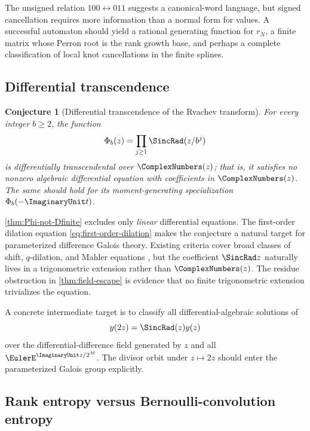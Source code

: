 \documentclass[11pt]{article}
\numberwithin{equation}{section}
\newtheorem{conjecture}[theorem]{Conjecture}
\theoremstyle{definition}
\theoremstyle{remark}
\begin{document}
The unsigned relation $100\leftrightarrow011$ suggests a canonical-word
language, but signed cancellation requires more information than a normal form
for values.  A successful automaton should yield a rational generating
function for $r_N$, a finite matrix whose Perron root is the rank growth base,
and perhaps a complete classification of local knot cancellations in the
finite splines.

\subsection{Differential transcendence}

\begin{conjecture}[Differential transcendence of the Rvachev transform]
\label{conj:differential-transcendence}
For every integer $b\ge2$, the function
\begin{equation}
 \Phi_b(z)=\prod_{j\ge1}\SincRad(z/b^j)
 \label{eq:DT-conjecture-function}
\end{equation}
is differentially transcendental over $\ComplexNumbers(z)$; that is, it satisfies no
nonzero algebraic differential equation with coefficients in $\ComplexNumbers(z)$.
The same should hold for its moment-generating specialization
$\Phi_b(-\ImaginaryUnit t)$.
\end{conjecture}

\cref{thm:Phi-not-Dfinite} excludes only \emph{linear} differential equations.
The first-order dilation equation \eqref{eq:first-order-dilation} makes the
conjecture a natural target for parameterized difference Galois theory.
Existing criteria cover broad classes of shift, $q$-dilation, and Mahler
equations \cite{ArrecheDreyfusRoques,AdamczewskiDreyfusHardouinWibmer}, but the
coefficient $\SincRad z$ naturally lives in a trigonometric extension rather than
$\ComplexNumbers(z)$.  The residue obstruction in \cref{thm:field-escape} is evidence that no
finite trigonometric extension trivializes the equation.

A concrete intermediate target is to classify all differential-algebraic
solutions of
\begin{equation}
 y(2z)=\SincRad(z)y(z)
 \label{eq:dilation-DT-target}
\end{equation}
over the differential-difference field generated by
$z$ and all $\EulerE^{\ImaginaryUnit z/2^M}$.  The divisor orbit under $z\mapsto2z$ should enter
the parameterized Galois group explicitly.

\subsection{Rank entropy versus Bernoulli-convolution entropy}
\end{document}

